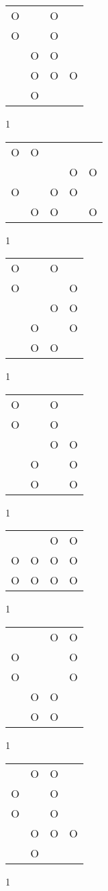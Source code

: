 \begin{tabular}{|m{0.2cm}m{0.2cm}m{0.2cm}m{0.2cm}|}\hline
O& &O& \\
O& &O& \\
 &O&O& \\
 &O&O&O\\
 &O& & \\
\hline\end{tabular}1
\begin{tabular}{|m{0.2cm}m{0.2cm}m{0.2cm}m{0.2cm}m{0.2cm}|}\hline
O&O& & & \\
 & & &O&O\\
O& &O&O& \\
 &O&O& &O\\
\hline\end{tabular}1
\begin{tabular}{|m{0.2cm}m{0.2cm}m{0.2cm}m{0.2cm}|}\hline
O& &O& \\
O& & &O\\
 & &O&O\\
 &O& &O\\
 &O&O& \\
\hline\end{tabular}1
\begin{tabular}{|m{0.2cm}m{0.2cm}m{0.2cm}m{0.2cm}|}\hline
O& &O& \\
O& &O& \\
 & &O&O\\
 &O& &O\\
 &O& &O\\
\hline\end{tabular}1
\begin{tabular}{|m{0.2cm}m{0.2cm}m{0.2cm}m{0.2cm}|}\hline
 & &O&O\\
O&O&O&O\\
O&O&O&O\\
\hline\end{tabular}1
\begin{tabular}{|m{0.2cm}m{0.2cm}m{0.2cm}m{0.2cm}|}\hline
 & &O&O\\
O& & &O\\
O& & &O\\
 &O&O& \\
 &O&O& \\
\hline\end{tabular}1
\begin{tabular}{|m{0.2cm}m{0.2cm}m{0.2cm}m{0.2cm}|}\hline
 &O&O& \\
O& &O& \\
O& &O& \\
 &O&O&O\\
 &O& & \\
\hline\end{tabular}1
